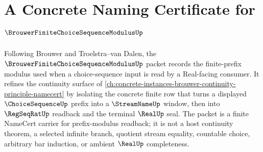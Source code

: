 \chapter{A Concrete Naming Certificate for $\BrouwerFiniteChoiceSequenceModulusUp$}
\label{ch:concrete-instances-brouwer-finite-choice-sequence-modulus-namecert}

Following Brouwer and Troelstra--van Dalen, the $\BrouwerFiniteChoiceSequenceModulusUp$ packet records the finite-prefix modulus used when a choice-sequence input is read by a Real-facing consumer. It refines the continuity surface of \autoref{ch:concrete-instances-brouwer-continuity-principle-namecert} by isolating the concrete finite row that turns a displayed $\ChoiceSequenceUp$ prefix into a $\StreamNameUp$ window, then into $\RegSeqRatUp$ readback and the terminal $\RealUp$ seal. The packet is a finite NameCert carrier for prefix-modulus readback; it is not a host continuity theorem, a selected infinite branch, quotient stream equality, countable choice, arbitrary bar induction, or ambient $\RealUp$ completeness.

